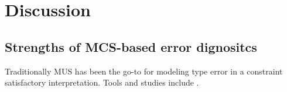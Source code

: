 \documentclass[pdflatex,sn-mathphys-num]{sn-jnl}%
\begin{document}

    
  
        


    \section{Discussion} \label{sec:discussion}
    

    \subsection{Strengths of MCS-based error dignositcs}
    Traditionally MUS has been the go-to for modeling type error in a constraint satisfactory interpretation. Tools and studies include .
\end{document}
